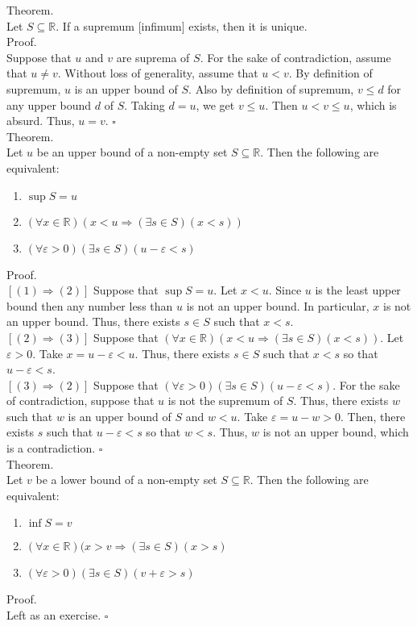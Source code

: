 \documentclass[twocolumn]{article}
\newcommand{\qed}{$\square$}
\newcommand{\reals}{\mathbb{R}}
\begin{document}
Theorem. \\
Let $S \subseteq \reals$. If a supremum [infimum] exists, then it is unique. \\
Proof. \\
Suppose that $u$ and $v$ are suprema of $S$. For the sake of contradiction, assume that $u \neq v$. Without loss of generality, assume that $u < v$. By definition of supremum, $u$ is an upper bound of $S$. Also by definition of supremum, $v \leq d$ for any upper bound $d$ of $S$. Taking $d = u$, we get $v \leq u$. Then $u < v \leq u$, which is absurd. Thus, $u = v$. \qed \\

Theorem. \\
Let $u$ be an upper bound of a non-empty set $S \subseteq \reals$. Then the following are equivalent:
\begin{enumerate}
	\item
		$\sup S = u$
	\item
		$(\forall x \in \reals)(x < u \Rightarrow (\exists s \in S)(x < s))$
	\item
		$(\forall \varepsilon > 0)(\exists s \in S)(u - \varepsilon < s)$
\end{enumerate}
Proof. \\
$\left[(1) \Rightarrow (2)\right]$ Suppose that $\sup S = u$. Let $x < u$. Since $u$ is the least upper bound then any number less than $u$ is not an upper bound. In particular, $x$ is not an upper bound. Thus, there exists $s \in S$ such that $x < s$. \\
$\left[(2) \Rightarrow (3)\right]$ Suppose that $(\forall x \in \reals)(x < u \Rightarrow (\exists s \in S)(x < s))$. Let $\varepsilon > 0$. Take $x = u - \varepsilon < u$. Thus, there exists $s \in S$ such that $x < s$ so that $u - \varepsilon < s$. \\
$\left[(3) \Rightarrow (2)\right]$ Suppose that $(\forall \varepsilon > 0)(\exists s \in S)(u - \varepsilon < s)$. For the sake of contradiction, suppose that $u$ is not the supremum of $S$. Thus, there exists $w$ such that $w$ is an upper bound of $S$ and $w < u$. Take $\varepsilon = u - w > 0$. Then, there exists $s$ such that $u - \varepsilon < s$ so that $w < s$. Thus, $w$ is not an upper bound, which is a contradiction. \qed \\

Theorem. \\
Let $v$ be a lower bound of a non-empty set $S \subseteq \reals$. Then the following are equivalent:
\begin{enumerate}
	\item
		$\inf S = v$
	\item
		$(\forall x \in \reals)(x > v \Rightarrow (\exists s \in S)(x > s)$
	\item
		$(\forall \varepsilon > 0)(\exists s \in S)(v + \varepsilon > s)$
\end{enumerate}
Proof. \\
Left as an exercise. \qed \\
\end{document}

